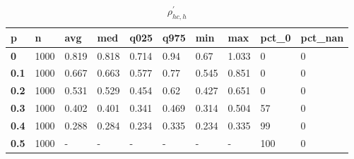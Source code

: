 \begin{table}[h]
 \centering 
\footnotesize
\caption{$\rho_{hc,h}^\prime $}
\label{tab:alphahch}
\begin{tabular}[h]{|l|l|l|l|l|l|l|l|l|l|
    } \hline
\textbf{ p} & \textbf{ n} & \textbf{ avg} & \textbf{ med} & \textbf{ q025} & \textbf{ q975} & \textbf{ min} & \textbf{ max} & \textbf{ pct\_0} & \textbf{ pct\_nan}
    \\ \hline
  \textbf{  0} & 1000 & 0.819 & 0.818 & 0.714 &  0.94 &  0.67 & 1.033 &   0 & 0
    \\ \hline
  \textbf{0.1} & 1000 & 0.667 & 0.663 & 0.577 &  0.77 & 0.545 & 0.851 &   0 & 0
    \\ \hline
  \textbf{0.2} & 1000 & 0.531 & 0.529 & 0.454 &  0.62 & 0.427 & 0.651 &   0 & 0
    \\ \hline
  \textbf{0.3} & 1000 & 0.402 & 0.401 & 0.341 & 0.469 & 0.314 & 0.504 &  57 & 0
    \\ \hline
  \textbf{0.4} & 1000 & 0.288 & 0.284 & 0.234 & 0.335 & 0.234 & 0.335 &  99 & 0
    \\ \hline
  \textbf{0.5} & 1000 & - & - & - & - & - & - & 100 & 0
    \\ \hline
 \end{tabular}
 \end{table}
